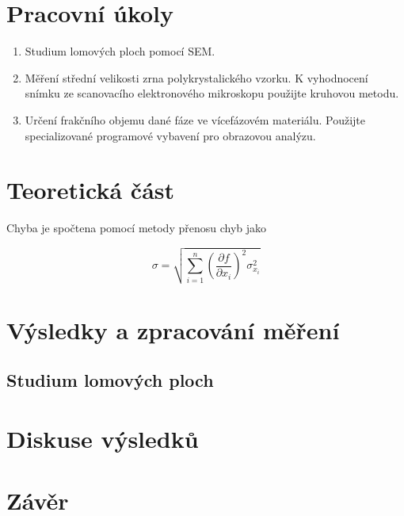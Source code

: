 \section{Pracovní úkoly}

\begin{enumerate}
\item Studium lomových ploch pomocí SEM.

\item Měření střední velikosti zrna polykrystalického vzorku. K vyhodnocení snímku ze scanovacího elektronového mikroskopu použijte kruhovou metodu.

\item Určení frakčního objemu dané fáze ve vícefázovém materiálu. Použijte specializované programové vybavení pro obrazovou analýzu.
\end{enumerate}

\section{Teoretická část}

Chyba je spočtena pomocí metody přenosu chyb \cite{bib:metoda-prenosu-chyb} jako

\begin{equation}
    \sigma = \sqrt{\sum^n_{i=1} \left( \frac{\partial f}{\partial x_i} \right)^2 \sigma^2_{x_i}}
\end{equation}

\section{Výsledky a zpracování měření}

\subsection{Studium lomových ploch}



    
\section{Diskuse výsledků}

\section{Závěr}
